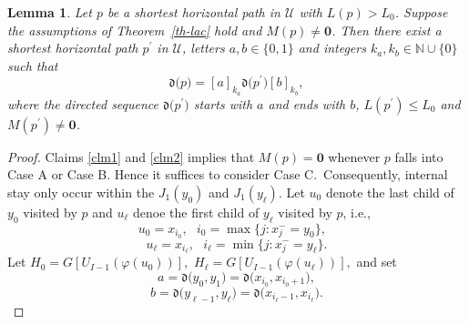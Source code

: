 \documentclass[reqno]{amsart}
\theoremstyle{plain}
\newtheorem{lemma}{Lemma}
\numberwithin{equation}{section}
\begin{document}
\begin{lemma}
\label{le-kakb}Let $p$ be a shortest horizontal path in $\mathcal{U}$ with $%
L(p)>L_{0}$. Suppose the assumptions of Theorem\ \ref{th-lac} hold and $%
M(p)\neq \mathbf{0}$. Then there exist a shortest horizontal path $p^{\prime
}$ in $\mathcal{U}$, letters $a,b\in \{0,1\}$ and integers $k_{a},k_{b}\in 
\mathbb{N}\cup \{0\}$ such that 
\begin{equation*}
\mathfrak{d(}p)=[a]_{k_{a}}\mathfrak{d(}p^{\prime })[b]_{k_{b}},
\end{equation*}%
where the directed sequence $\mathfrak{d(}p^{\prime })$ starts with $a$ and
ends with $b$, $L(p^{\prime })\leq L_{0}$ and $M(p^{\prime })\neq 
\boldsymbol{0}$.
\end{lemma}

\begin{proof}
Claims \ref{clm1} and \ref{clm2} implies that $M(p)=\boldsymbol{0}$ whenever 
$p$ falls into Case A or Case B. Hence it suffices to consider Case C.\
Consequently, internal stay only occur within the $J_{1}(y_{0})$ and $%
J_{1}(y_{\ell }).$ Let $u_{0}$ denote the last child of $y_{0}$ visited by $%
p $ and $u_{\ell }$ denoe the first child of $y_{\ell }$ visited by $p$,
i.e.,%
\begin{equation*}
u_{0}=x_{i_{0}},\text{ }i_{0}=\max \{j:x_{j}^{-}=y_{0}\},\text{ }
\end{equation*}%
\begin{equation*}
u_{\ell }=x_{i_{\ell }},\text{ }i_{\ell }=\min \{j:x_{j}^{-}=y_{\ell }\}.
\end{equation*}%
Let $H_{0}=G[U_{I-1}(\varphi (u_{0}))],$ $H_{\ell }=G[U_{I-1}(\varphi
(u_{\ell }))],$ and set 
\begin{equation*}
a=\mathfrak{d(}y_{0},y_{1})=\mathfrak{d(}x_{i_{0}},x_{i_{0}+1}),
\end{equation*}%
\begin{equation*}
b=\mathfrak{d(}y_{\ell -1},y_{\ell })=\mathfrak{d(}x_{i_{\ell
}-1},x_{i_{\ell }}).
\end{equation*}


\end{proof}
\end{document}
